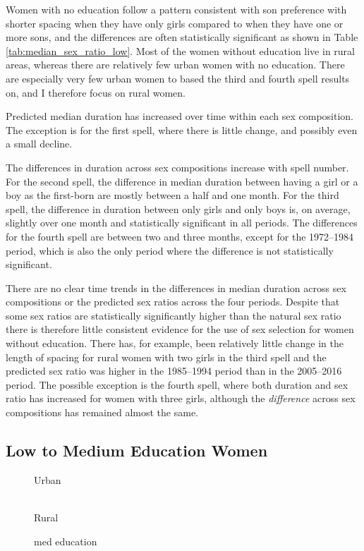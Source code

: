 \documentclass[12pt,letterpaper]{article}
\begin{document}


Women with no education follow a pattern consistent with son
preference with shorter spacing when they have only girls compared 
to when they have one or more sons, and the differences are often 
statistically significant as shown in Table \ref{tab:median_sex_ratio_low}.
Most of the women without education live in rural areas,
whereas there are relatively few urban women with no education.
There are especially very few urban women to based the third
and fourth spell results on, and I therefore focus on rural women.

Predicted median duration has increased over time within
each sex composition.
The exception is for the first spell, where there is little
change, and possibly even a small decline.

The differences in duration across sex compositions increase with 
spell number.
For the second spell, the difference in median duration between
having a girl or a boy as the first-born are mostly between a half
and one month.
For the third spell, the difference in duration between only girls 
and only boys is, on average, slightly over one month and statistically 
significant in all periods.
The differences for the fourth spell are between two and three months, 
except for the 1972--1984 period, which is also the only period where 
the difference is not statistically significant.

There are no clear time trends in the differences in median duration
across sex compositions or the predicted sex ratios across the four periods.
Despite that some sex ratios are statistically significantly higher 
than the natural sex ratio there is therefore little consistent evidence 
for the use of sex selection for women without education.
There has, for example, been relatively little change in the length
of spacing for rural women with two girls in the third spell and 
the predicted sex ratio was higher in the 1985--1994 period
than in the 2005--2016 period.
The possible exception is the fourth spell, where both duration 
and sex ratio has increased for women with three girls, although
the \emph{difference} across sex compositions has remained almost
the same.

\subsection{Low to Medium Education Women}


\begin{figure}[htpb]
\centering
\caption*{Urban}
\\
\caption*{Rural}
\caption{med education}
\end{figure}
\end{document}
